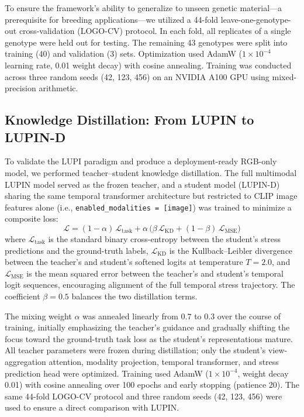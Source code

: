 \documentclass[a4paper,fleqn]{cas-dc}
\begin{document}
To ensure the framework's ability to generalize to unseen genetic material---a prerequisite for breeding applications---we utilized a 44-fold leave-one-genotype-out cross-validation (LOGO-CV) protocol. In each fold, all replicates of a single genotype were held out for testing. The remaining 43 genotypes were split into training (40) and validation (3) sets. Optimization used AdamW ($1 \times 10^{-4}$ learning rate, 0.01 weight decay) with cosine annealing. Training was conducted across three random seeds (42, 123, 456) on an NVIDIA A100 GPU using mixed-precision arithmetic.


\subsection{Knowledge Distillation: From LUPIN to LUPIN-D}\label{sec:methods:distillation}

To validate the LUPI paradigm and produce a deployment-ready RGB-only model, we performed teacher--student knowledge distillation. The full multimodal LUPIN model served as the frozen teacher, and a student model (LUPIN-D) sharing the same temporal transformer architecture but restricted to CLIP image features alone (i.e., \texttt{enabled\_modalities = [image]}) was trained to minimize a composite loss:
\begin{equation}\label{eq:distill}
    \mathcal{L} = (1-\alpha)\,\mathcal{L}_{\text{task}} + \alpha\,\bigl(\beta\,\mathcal{L}_{\text{KD}} + (1-\beta)\,\mathcal{L}_{\text{MSE}}\bigr)
\end{equation}
where $\mathcal{L}_{\text{task}}$ is the standard binary cross-entropy between the student's stress predictions and the ground-truth labels, $\mathcal{L}_{\text{KD}}$ is the Kullback--Leibler divergence between the teacher's and student's softened logits at temperature $T=2.0$, and $\mathcal{L}_{\text{MSE}}$ is the mean squared error between the teacher's and student's temporal logit sequences, encouraging alignment of the full temporal stress trajectory. The coefficient $\beta=0.5$ balances the two distillation terms.

The mixing weight $\alpha$ was annealed linearly from $0.7$ to $0.3$ over the course of training, initially emphasizing the teacher's guidance and gradually shifting the focus toward the ground-truth task loss as the student's representations mature. All teacher parameters were frozen during distillation; only the student's view-aggregation attention, modality projection, temporal transformer, and stress prediction head were optimized. Training used AdamW ($1\times10^{-4}$, weight decay 0.01) with cosine annealing over 100 epochs and early stopping (patience 20). The same 44-fold LOGO-CV protocol and three random seeds (42, 123, 456) were used to ensure a direct comparison with LUPIN.
\end{document}
